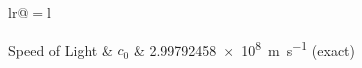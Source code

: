 \begin{constants}{lr@{${}={}$}l} %

	Speed of Light & $c_{0}$ & \SI{2.99792458e8}{\meter\per\second} (exact)\\

\end{constants}